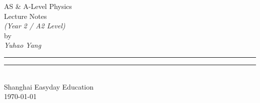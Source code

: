 \NoBgThispage 
\begin{center}
\vspace*{0.13\textheight}
{\Huge AS \& A-Level Physics}\\[\baselineskip]
{\Huge Lecture Notes}\\[1.5\baselineskip]
{\Huge\itshape (Year 2 / A2 Level)}\\[3\baselineskip]
{\Large\sc by}\\[0.5\baselineskip]
{\Large \textit{Yuhao Yang}} \\
\par
\vfill
{\color{cyan} \rule{\textwidth}{0.4pt}\vspace*{-\baselineskip}\vspace{3pt}
	\rule{\textwidth}{0.4pt}} \\[\baselineskip]
{\Large Shanghai Easyday Education} \\[0.5\baselineskip]
{\Large \today}\par
\vspace*{0.13\textheight}
\end{center}
